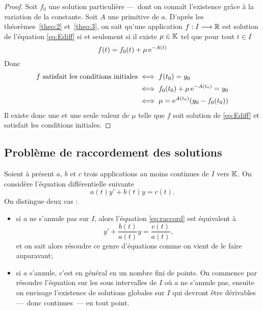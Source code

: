 \begin{proof}
  Soit \(f_0\) une solution particulière ---~dont on connaît l'existence grâce à 
  la variation de la constante. Soit \(A\) une primitive de \(a\). D'après les 
  théorèmes~\ref{theo:2} et~\ref{theo:3}, on sait qu'une application 
  \(f:I \longrightarrow{} \mathbb{R}\) est solution de l'équation \eqref{eq:Ediff} si et 
  seulement si il existe \(\mu \in \mathbb{K}\) tel que pour tout \(t \in I\)
  \begin{equation}
    f(t) = f_0(t) + \mu \operatorname{e}^{-A(t)}
  \end{equation}
  Donc 
  \begin{align}
    f \text{~satisfait les conditions initiales} & \iff f(t_0) = y_0 \\ 
                                                 & \iff f_0(t_0) + 
                                                 \mu\operatorname{e}^{-A(t_0)} = y_0 \\
                                                 & \iff \mu = 
                                                 \operatorname{e}^{A(t_0)}(y_0-f_0(t_0))
  \end{align}
  Il existe donc une et une seule valeur de \(\mu\) telle que \(f\) soit solution 
  de \eqref{eq:Ediff} et satisfait les conditions initiales.
\end{proof}

\subsection{Problème de raccordement des solutions}
\label{subsec:pbmraccordement}

Soient à présent \(a\), \(b\) et \(c\) trois applications au moins continues de 
\(I\) vers \(\mathbb{K}\). On considère l'équation différentielle suivante
\begin{equation}
  \label{eq:raccord}
  a(t) y' + b(t)y = c(t).
\end{equation}
On distingue deux cas :
\begin{itemize}
  \item si \(a\) ne s'annule pas sur \(I\), alors l'équation 
    \eqref{eq:raccord} est équivalent à
    \begin{equation}
      y' + \frac{b(t)}{a(t)} y = \frac{c(t)}{a(t)},
    \end{equation}
    et on sait alors résoudre ce genre d'équations comme on vient de le 
    faire auparavant;
  \item si \(a\) s'annule, c'est en général en un nombre fini de points. On 
    commence par résoudre l'équation sur les sous intervalles de \(I\) où 
    \(a\) ne s'annule pas, ensuite on envisage l'existence de solutions 
    globales sur \(I\) qui devront être dérivables ---~donc continues~--- en 
    tout point.
\end{itemize}

